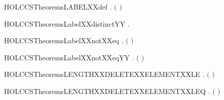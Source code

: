 \newcommand{\HOLCCSTheoremsLabelXXcaseXXeq}{\UseVerbatim{HOLCCSTheoremsLabelXXcaseXXeq}}
\begin{SaveVerbatim}{HOLCCSTheoremsLABELXXdef}
\HOLTokenTurnstile{} \HOLSymConst{\HOLTokenForall{}}.  \ensuremath{(} \ensuremath{)} \HOLSymConst{\ensuremath{=}} 
\end{SaveVerbatim}
\newcommand{\HOLCCSTheoremsLABELXXdef}{\UseVerbatim{HOLCCSTheoremsLABELXXdef}}
\begin{SaveVerbatim}{HOLCCSTheoremsLabelXXdistinctYY}
\HOLTokenTurnstile{} \HOLSymConst{\HOLTokenForall{}} .   \HOLSymConst{\HOLTokenNotEqual{}}  
\end{SaveVerbatim}
\newcommand{\HOLCCSTheoremsLabelXXdistinctYY}{\UseVerbatim{HOLCCSTheoremsLabelXXdistinctYY}}
\begin{SaveVerbatim}{HOLCCSTheoremsLabelXXnotXXeq}
\HOLTokenTurnstile{} \HOLSymConst{\HOLTokenForall{}} . \ensuremath{(}  \HOLSymConst{\ensuremath{=}}  \ensuremath{)} \HOLSymConst{\HOLTokenEquiv{}} 
\end{SaveVerbatim}
\newcommand{\HOLCCSTheoremsLabelXXnotXXeq}{\UseVerbatim{HOLCCSTheoremsLabelXXnotXXeq}}
\begin{SaveVerbatim}{HOLCCSTheoremsLabelXXnotXXeqYY}
\HOLTokenTurnstile{} \HOLSymConst{\HOLTokenForall{}} . \ensuremath{(}  \HOLSymConst{\ensuremath{=}}  \ensuremath{)} \HOLSymConst{\HOLTokenEquiv{}} 
\end{SaveVerbatim}
\newcommand{\HOLCCSTheoremsLabelXXnotXXeqYY}{\UseVerbatim{HOLCCSTheoremsLabelXXnotXXeqYY}}
\begin{SaveVerbatim}{HOLCCSTheoremsLENGTHXXDELETEXXELEMENTXXLE}
\HOLTokenTurnstile{} \HOLSymConst{\HOLTokenForall{}} .    \HOLSymConst{\HOLTokenImp{}}  \ensuremath{(}  \ensuremath{)} \HOLSymConst{\HOLTokenLt{}}  
\end{SaveVerbatim}
\newcommand{\HOLCCSTheoremsLENGTHXXDELETEXXELEMENTXXLE}{\UseVerbatim{HOLCCSTheoremsLENGTHXXDELETEXXELEMENTXXLE}}
\begin{SaveVerbatim}{HOLCCSTheoremsLENGTHXXDELETEXXELEMENTXXLEQ}
\HOLTokenTurnstile{} \HOLSymConst{\HOLTokenForall{}} .  \ensuremath{(}  \ensuremath{)} \HOLSymConst{\HOLTokenLeq{}}  
\end{SaveVerbatim}
